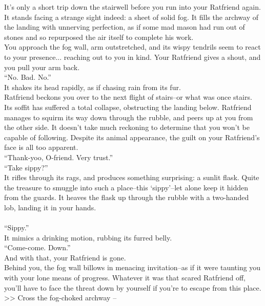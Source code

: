 It’s only a short trip down the stairwell before you run into your Ratfriend again. It stands facing a strange sight indeed: a sheet of solid fog. It fills the archway of the landing with unnerving perfection, as if some mad mason had run out of stones and so repurposed the air itself to complete his work.\\

You approach the fog wall, arm outstretched, and its wispy tendrils seem to react to your presence... reaching out to you in kind. Your Ratfriend gives a shout, and you pull your arm back.\\

“No. Bad. No.”\\
It shakes its head rapidly, as if chasing rain from its fur.\\

Ratfriend beckons you over to the next flight of stairs--or what was once stairs. Its soffit has suffered a total collapse, obstructing the landing below. Ratfriend manages to squirm its way down through the rubble, and peers up at you from the other side. It doesn’t take much reckoning to determine that you won’t be capable of following. Despite its animal appearance, the guilt on your Ratfriend’s face is all too apparent.\\

“Thank-yoo, O-friend. Very trust.”\\

“Take sippy?”\\
It rifles through its rags, and produces something surprising: a sunlit flask. Quite the treasure to smuggle into such a place--this ‘sippy’--let alone keep it hidden from the guards. It heaves the flask up through the rubble with a two-handed lob, landing it in your hands.\\
\\

“Sippy.”\\
It mimics a drinking motion, rubbing its furred belly.\\

“Come-come. Down.”\\
And with that, your Ratfriend is gone.\\

Behind you, the fog wall billows in menacing invitation--as if it were taunting you with your lone means of progress. Whatever it was that scared Ratfriend off, you’ll have to face the threat down by yourself if you’re to escape from this place.\\

>> Cross the fog-choked archway -- 